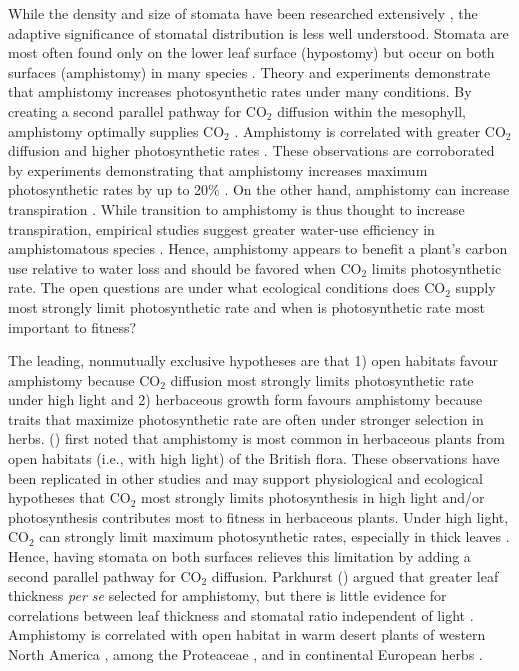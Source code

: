 \documentclass[12pt, oneside]{article}
\begin{document}
While the density and size of stomata have been researched extensively \citep[and references therein]{Sack_Buckley_2016}, the adaptive significance of stomatal distribution is less well understood. Stomata are most often found only on the lower leaf surface (hypostomy) but occur on both surfaces (amphistomy) in many species \citep{Metcalfe_Chalk_1950, Parkhurst_1978, Mott_etal_1982}. Theory and experiments demonstrate that amphistomy increases photosynthetic rates under many conditions. By creating a second parallel pathway for CO$_2$ diffusion within the mesophyll, amphistomy optimally supplies CO$_2$ \citep{Parkhurst_1978, Gutschick_1984b, Jones_1985}. Amphistomy is correlated with greater CO$_2$ diffusion \citep{Beerling_Kelly_1996} and higher photosynthetic rates \citep{Mckown_etal_2014}. These observations are corroborated by experiments demonstrating that amphistomy increases maximum photosynthetic rates by up to 20\% \citep{Parkhurst_Mott_1990}. On the other hand, amphistomy can increase transpiration \citep{Jones_1985, Foster_Smith_1986, Buckley_etal_2015}. While transition to amphistomy is thus thought to increase transpiration, empirical studies suggest greater water-use efficiency in amphistomatous species \citep{Bucher_etal_2017}. Hence, amphistomy appears to benefit a plant's carbon use relative to water loss and should be favored when CO$_2$ limits photosynthetic rate. The open questions are under what ecological conditions does CO$_2$ supply most strongly limit photosynthetic rate \citep{Peat_Fitter_1994b} and when is photosynthetic rate most important to fitness?

The leading, nonmutually exclusive hypotheses are that 1) open habitats favour amphistomy because CO$_2$ diffusion most strongly limits photosynthetic rate under high light and 2) herbaceous growth form favours amphistomy because traits that maximize photosynthetic rate are often under stronger selection in herbs. \citeauthor{Salisbury_1927} (\citeyear{Salisbury_1927}) first noted that amphistomy is most common in herbaceous plants from open habitats (i.e., with high light) of the British flora. These observations have been replicated in other studies \citep{Mott_etal_1982, Peat_Fitter_1994b, Jordan_etal_2014, Muir_2015} and may support physiological and ecological hypotheses that CO$_2$ most strongly limits photosynthesis in high light and/or photosynthesis contributes most to fitness in herbaceous plants. Under high light, CO$_2$ can strongly limit maximum photosynthetic rates, especially in thick leaves \citep{Jones_1985}. Hence, having stomata on both surfaces relieves this limitation by adding a second parallel pathway for CO$_2$ diffusion. Parkhurst (\citeyear{Parkhurst_1978}) argued that greater leaf thickness \textit{per se} selected for amphistomy, but there is little evidence for correlations between leaf thickness and stomatal ratio independent of light \citep{Mott_etal_1982, Gibson_1996, Muir_2015}. Amphistomy is correlated with open habitat in warm desert plants of western North America \citep{Mott_etal_1982, Gibson_1996}, among the Proteaceae \citep{Jordan_etal_2014}, and in continental European herbs \citep{Bucher_etal_2017}.
\end{document}

